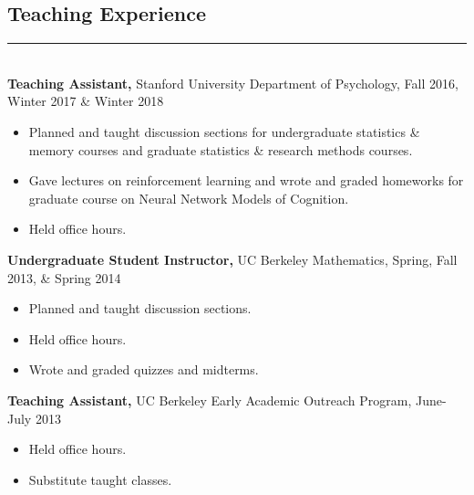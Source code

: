 \documentclass[margin]{res}
\begin{document}
\begin{resume}
\vspace{1pt}\section{Teaching Experience} \vspace{-15pt} \rule{\textwidth}{0.5pt} \\[3pt]
{\bf Teaching Assistant,} Stanford University Department of Psychology, Fall 2016, Winter 2017 \& Winter 2018
\begin{itemize} \itemsep -2pt
  \item Planned and taught discussion sections for undergraduate statistics \& memory courses and graduate statistics \& research methods courses. \item Gave lectures on reinforcement learning and wrote and graded homeworks for graduate course on Neural Network Models of Cognition. \item Held office hours. \end{itemize}\vspace{-8pt}
{\bf Undergraduate Student Instructor,} UC Berkeley Mathematics, Spring, Fall 2013, \& Spring 2014 
\begin{itemize} \itemsep -2pt
  \item Planned and taught discussion sections. \item Held office hours. \item Wrote and graded quizzes and midterms. \end{itemize}\vspace{-8pt}
{\bf Teaching Assistant,} UC Berkeley Early Academic Outreach Program, June-July 2013
\begin{itemize} \itemsep -2pt
 \item Held office hours. \item Substitute taught classes. \end{itemize}


\end{resume}
\end{document}
